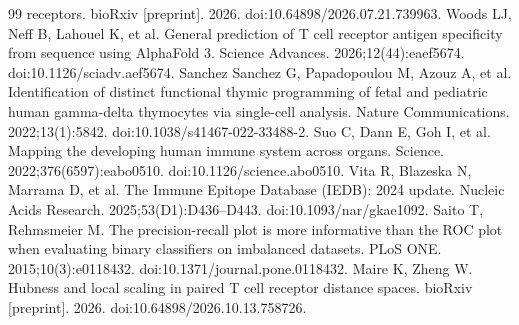 \documentclass[a4paper,11pt]{article}
\begin{document}
\begin{thebibliography}{99}
receptors. bioRxiv [preprint]. 2026. doi:10.64898/2026.07.21.739963.
 Woods LJ, Neff B, Lahouel K, et al.
General prediction of T cell receptor antigen specificity from sequence using AlphaFold 3.
Science Advances. 2026;12(44):eaef5674. doi:10.1126/sciadv.aef5674.
 Sanchez Sanchez G, Papadopoulou M, Azouz A, et al.
Identification of distinct functional thymic programming of fetal and pediatric
human gamma-delta thymocytes via single-cell analysis.
Nature Communications. 2022;13(1):5842. doi:10.1038/s41467-022-33488-2.
 Suo C, Dann E, Goh I, et al.
Mapping the developing human immune system across organs.
Science. 2022;376(6597):eabo0510. doi:10.1126/science.abo0510.
 Vita R, Blazeska N, Marrama D, et al.
The Immune Epitope Database (IEDB): 2024 update.
Nucleic Acids Research. 2025;53(D1):D436--D443. doi:10.1093/nar/gkae1092.
 Saito T, Rehmsmeier M.
The precision-recall plot is more informative than the ROC plot when evaluating
binary classifiers on imbalanced datasets.
PLoS ONE. 2015;10(3):e0118432. doi:10.1371/journal.pone.0118432.
 Maire K, Zheng W.
Hubness and local scaling in paired T cell receptor distance spaces.
bioRxiv [preprint]. 2026. doi:10.64898/2026.10.13.758726.
\end{thebibliography}
\end{document}
